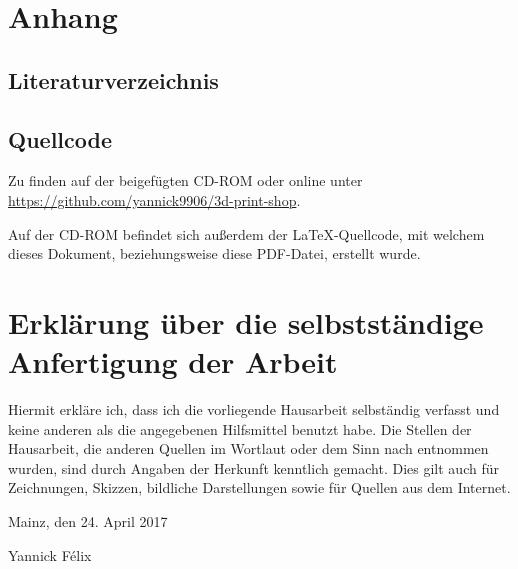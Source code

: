 \documentclass[a4paper,12pt,ngerman,listof=numbered]{scrartcl}      %
\let\oldcite\cite
\renewcommand{\cite}[1]{\textsuperscript{\oldcite{#1}}}
\begin{document}
	
	\newpage
	\section{Anhang}
	\subsection{Literaturverzeichnis}
	\printbibliography[heading=none]
		
	\subsection{Quellcode}
	Zu finden auf der beigefügten CD-ROM oder online unter \url{https://github.com/yannick9906/3d-print-shop}.\par
	Auf der CD-ROM befindet sich außerdem der \LaTeX-Quellcode, mit welchem dieses Dokument, beziehungsweise diese PDF-Datei, erstellt wurde.
	
	\newpage
	\section{Erklärung über die selbstständige Anfertigung der Arbeit}
	Hiermit erkläre ich, dass ich die vorliegende Hausarbeit selbständig verfasst und keine anderen als die angegebenen Hilfsmittel benutzt habe.
	Die Stellen der Hausarbeit, die anderen Quellen im Wortlaut oder dem Sinn nach entnommen wurden, sind durch Angaben der Herkunft kenntlich gemacht. Dies gilt auch für Zeichnungen, Skizzen, bildliche Darstellungen sowie für Quellen aus dem Internet.\cite{erklaerung}\par
	\vspace{0.5cm}
	\noindent Mainz, den 24. April 2017\par
	\vspace{2cm}
	\noindent Yannick F\'{e}lix
	\vfill
	\doclicenseThis
\end{document}
